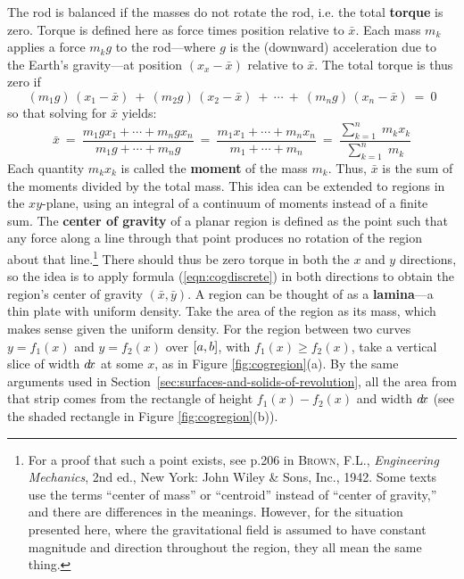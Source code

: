 The rod is balanced if the masses do not rotate the rod, i.e. the total
\textbf{torque} is zero. Torque is defined here as force times position relative
to $\bar{x}$. Each mass $m_k$ applies a force $m_kg$ to the rod---where $g$ is
the (downward) acceleration due to the Earth's gravity---at position
$(x_x-\bar{x})$ relative to $\bar{x}$. The total torque is thus zero if
\[
(m_1g)\,(x_1-\bar{x}) ~+~ (m_2g)\,(x_2-\bar{x}) ~+~ \cdots ~+~
(m_ng)\,(x_n-\bar{x}) ~=~ 0
\]
so that solving for $\bar{x}$ yields:
\begin{equation}\label{eqn:cogdiscrete}
\bar{x} ~=~ \frac{m_1gx_1 + \cdots +  m_ngx_n}{m_1g + \cdots + m_ng} ~=~
            \frac{m_1x_1 + \cdots + m_nx_n}{m_1 + \cdots + m_n} ~=~
            \frac{\sum_{k=1}^n \;m_kx_k}{\sum_{k=1}^n \;m_k}
\end{equation}
Each quantity $m_kx_k$ is called the \textbf{moment} of the mass $m_k$. Thus,
$\bar{x}$ is the sum of the moments divided by the total mass. This idea can be
extended to regions in the $xy$-plane, using an integral of a continuum of
moments instead of a finite sum. The \textbf{center of gravity} of a
planar region is defined as the point such that any force along a line through
that point produces no rotation of the region about that line.\footnote{For a
proof that such a point exists, see p.206 in \textsc{Brown, F.L.},
\emph{Engineering Mechanics}, 2nd ed., New York: John Wiley \& Sons, Inc., 1942.
Some texts use the terms ``center of mass'' or ``centroid'' instead of ``center
of gravity,'' and there are differences in the meanings. However, for the
situation presented here, where the gravitational field is assumed to have
constant magnitude and direction throughout the region, they all mean the same
thing.} There should thus be zero torque in both the $x$ and $y$ directions, so
the idea is to apply formula (\ref{eqn:cogdiscrete}) in both directions
to obtain the region's center of gravity $(\bar{x},\bar{y})$.
\newpage
A region can be thought of as a \textbf{lamina}---a thin plate with uniform
density. Take the area of the region as its mass, which makes sense
given the uniform density. For the region between two curves
$y=f_1(x)$ and $y=f_2(x)$ over $\lbrack a,b \rbrack$, with $f_1(x) \ge f_2(x)$, take a
vertical slice of width $d\!x$ at some $x$, as in Figure \ref{fig:cogregion}(a).
By the same arguments used in Section~\ref{sec:surfaces-and-solids-of-revolution}, all the area from that strip comes
from the rectangle of height $f_1(x)-f_2(x)$ and width $d\!x$ (see the shaded
rectangle in Figure \ref{fig:cogregion}(b)).


